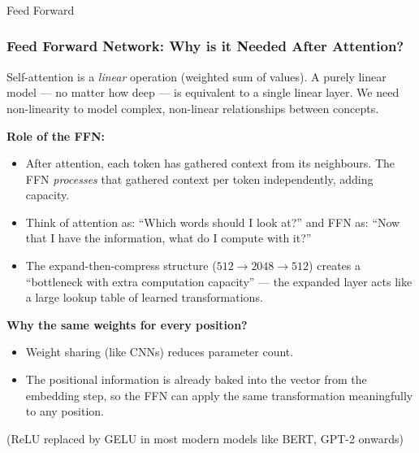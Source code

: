 
			
			
		


\begin{frame}[fragile]\frametitle{}
\begin{center}
{\Large Feed Forward}
\end{center}
\end{frame}

\begin{frame}[fragile]\frametitle{Feed Forward Network: Why is it Needed After Attention?}

Self-attention is a \emph{linear} operation (weighted sum of values). A purely linear model --- no matter how deep --- is equivalent to a single linear layer. We need non-linearity to model complex, non-linear relationships between concepts.

\textbf{Role of the FFN:}
\begin{itemize}
\item After attention, each token has gathered context from its neighbours. The FFN \emph{processes} that gathered context per token independently, adding capacity.
\item Think of attention as: ``Which words should I look at?'' and FFN as: ``Now that I have the information, what do I compute with it?''
\item The expand-then-compress structure ($512 \to 2048 \to 512$) creates a ``bottleneck with extra computation capacity'' --- the expanded layer acts like a large lookup table of learned transformations.
\end{itemize}

\textbf{Why the same weights for every position?}
\begin{itemize}
\item Weight sharing (like CNNs) reduces parameter count.
\item The positional information is already baked into the vector from the embedding step, so the FFN can apply the same transformation meaningfully to any position.
\end{itemize}

{\tiny (ReLU replaced by GELU in most modern models like BERT, GPT-2 onwards)}

\end{frame}

